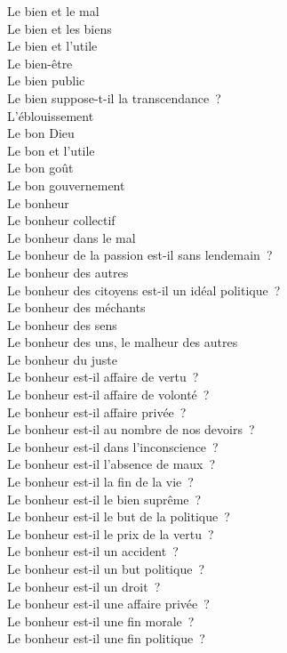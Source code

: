 \documentclass[a4paper,12pt]{article}
\begin{document}
Le bien et le mal \\
Le bien et les biens \\
Le bien et l'utile \\
Le bien-être \\
Le bien public \\
Le bien suppose-t-il la transcendance ? \\
L'éblouissement \\
Le bon Dieu \\
Le bon et l'utile \\
Le bon goût \\
Le bon gouvernement \\
Le bonheur \\
Le bonheur collectif \\
Le bonheur dans le mal \\
Le bonheur de la passion est-il sans lendemain ? \\
Le bonheur des autres \\
Le bonheur des citoyens est-il un idéal politique ? \\
Le bonheur des méchants \\
Le bonheur des sens \\
Le bonheur des uns, le malheur des autres \\
Le bonheur du juste \\
Le bonheur est-il affaire de vertu ? \\
Le bonheur est-il affaire de volonté ? \\
Le bonheur est-il affaire privée ? \\
Le bonheur est-il au nombre de nos devoirs ? \\
Le bonheur est-il dans l'inconscience ? \\
Le bonheur est-il l'absence de maux ? \\
Le bonheur est-il la fin de la vie ? \\
Le bonheur est-il le bien suprême ? \\
Le bonheur est-il le but de la politique ? \\
Le bonheur est-il le prix de la vertu ? \\
Le bonheur est-il un accident ? \\
Le bonheur est-il un but politique ? \\
Le bonheur est-il un droit ? \\
Le bonheur est-il une affaire privée ? \\
Le bonheur est-il une fin morale ? \\
Le bonheur est-il une fin politique ? \\
\end{document}
